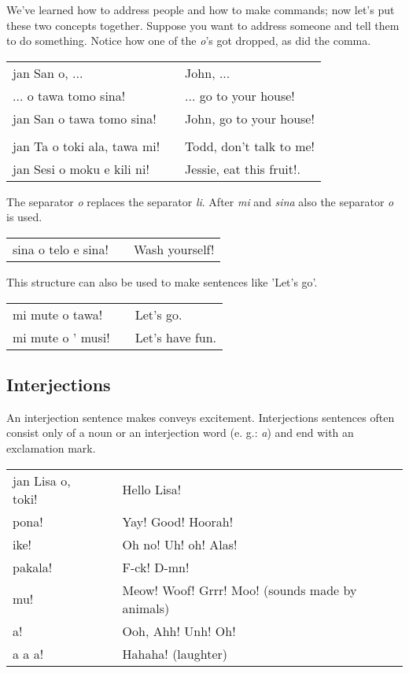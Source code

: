 We've learned how to address people and how to make commands; now let's put these two concepts together. 
Suppose you want to address someone and tell them to do something. 
Notice how one of the \textit{o}'s got dropped, as did the comma. 

\begin{supertabular}{p{5,5cm}|ll}
jan San o, ...  && John, ... \\ %
 ... o tawa tomo sina! && ... go to your house! \\ %
jan San o tawa tomo sina!  && John, go to your house! \\
 && \\ %
jan Ta o toki ala, tawa mi! && Todd, don't talk to me! \\
jan Sesi o moku e kili ni! && Jessie, eat this fruit!. \\
\end{supertabular} 

The separator \textit{o} replaces the separator \textit{li}. After \textit{mi} and \textit{sina} also the separator \textit{o} is used. 

\begin{supertabular}{p{5,5cm}|ll}
sina o telo e sina! && Wash yourself! \\
\end{supertabular} 

This structure can also be used to make sentences like 'Let's go'.

\begin{supertabular}{p{5,5cm}|ll}
mi mute o tawa! && Let's go. \\
mi mute o ' musi! && Let's have fun. \\
\end{supertabular} 
%
\subsection*{Interjections}
%
%
An interjection sentence makes conveys excitement.
Interjections sentences often consist only of a noun or an interjection word (e. g.: \textit{a}) and end with an exclamation mark.

\begin{supertabular}{p{5,5cm}|ll}
jan Lisa o, toki! && Hello Lisa! \\
pona! && Yay! Good! Hoorah! \\
ike! && Oh no! Uh! oh! Alas! \\
pakala! && F-ck! D-mn! \\
mu! && Meow! Woof! Grrr! Moo! (sounds made by animals) \\
a! && Ooh, Ahh! Unh! Oh! \\
a a a! && Hahaha! (laughter) \\
\end{supertabular} 


